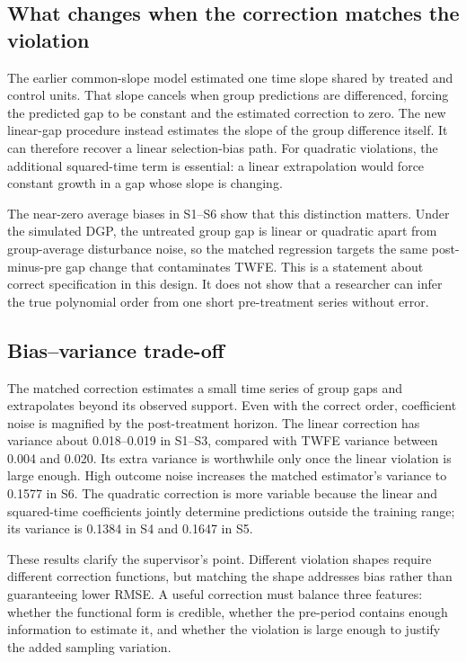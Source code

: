 \documentclass[11pt,a4paper]{article}
\begin{document}
\subsection{What changes when the correction matches the violation}
The earlier common-slope model estimated one time slope shared by treated and control units. That slope cancels when group predictions are differenced, forcing the predicted gap to be constant and the estimated correction to zero. The new linear-gap procedure instead estimates the slope of the group difference itself. It can therefore recover a linear selection-bias path. For quadratic violations, the additional squared-time term is essential: a linear extrapolation would force constant growth in a gap whose slope is changing.

The near-zero average biases in S1--S6 show that this distinction matters. Under the simulated DGP, the untreated group gap is linear or quadratic apart from group-average disturbance noise, so the matched regression targets the same post-minus-pre gap change that contaminates TWFE. This is a statement about correct specification in this design. It does not show that a researcher can infer the true polynomial order from one short pre-treatment series without error.

\subsection{Bias--variance trade-off}
The matched correction estimates a small time series of group gaps and extrapolates beyond its observed support. Even with the correct order, coefficient noise is magnified by the post-treatment horizon. The linear correction has variance about 0.018--0.019 in S1--S3, compared with TWFE variance between 0.004 and 0.020. Its extra variance is worthwhile only once the linear violation is large enough. High outcome noise increases the matched estimator's variance to 0.1577 in S6. The quadratic correction is more variable because the linear and squared-time coefficients jointly determine predictions outside the training range; its variance is 0.1384 in S4 and 0.1647 in S5.

These results clarify the supervisor's point. Different violation shapes require different correction functions, but matching the shape addresses bias rather than guaranteeing lower RMSE. A useful correction must balance three features: whether the functional form is credible, whether the pre-period contains enough information to estimate it, and whether the violation is large enough to justify the added sampling variation.
\end{document}
